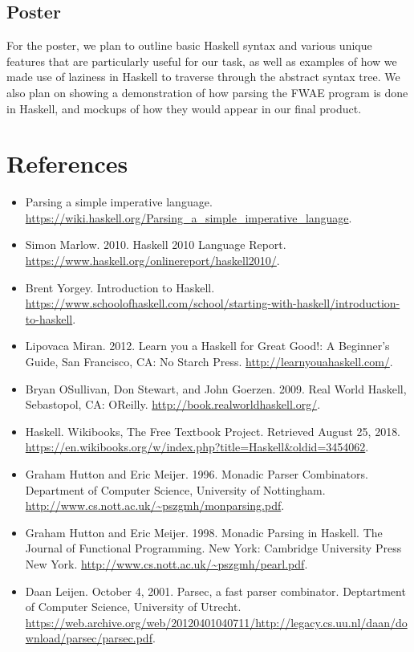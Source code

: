 \subsection{Poster}
For the poster, we plan to outline basic Haskell syntax and various unique features that are particularly useful for our task, as well as examples of how we made use of laziness in Haskell to traverse through the abstract syntax tree. We also plan on showing a demonstration of how parsing the FWAE program is done in Haskell, and mockups of how they would appear in our final product.


\section{References}
\begin{itemize}
    \item Parsing a simple imperative language. \url{https://wiki.haskell.org/Parsing_a_simple_imperative_language}.
    \item Simon Marlow. 2010. Haskell 2010 Language Report. \url{https://www.haskell.org/onlinereport/haskell2010/}.
    \item Brent Yorgey. Introduction to Haskell. \url{https://www.schoolofhaskell.com/school/starting-with-haskell/introduction-to-haskell}.
    \item Lipovaca Miran. 2012. Learn you a Haskell for Great Good!: A Beginner's Guide, San Francisco, CA: No Starch Press. \url{http://learnyouahaskell.com/}.
    \item Bryan OSullivan, Don Stewart, and John Goerzen. 2009. Real World Haskell, Sebastopol, CA: OReilly. \url{http://book.realworldhaskell.org/}.
    \item Haskell. Wikibooks, The Free Textbook Project. Retrieved August 25, 2018. \url{https://en.wikibooks.org/w/index.php?title=Haskell&oldid=3454062}.
    \item Graham Hutton and Eric Meijer. 1996. Monadic Parser Combinators. Department of Computer Science, University of Nottingham. \url{http://www.cs.nott.ac.uk/~pszgmh/monparsing.pdf}.
    \item Graham Hutton and Eric Meijer. 1998. Monadic Parsing in Haskell. The Journal of Functional Programming. New York: Cambridge University Press New York. \url{http://www.cs.nott.ac.uk/~pszgmh/pearl.pdf}.
    \item Daan Leijen. October 4, 2001. Parsec, a fast parser combinator. Deptartment of Computer Science, University of Utrecht. \url{https://web.archive.org/web/20120401040711/http://legacy.cs.uu.nl/daan/download/parsec/parsec.pdf}.

\end{itemize}
